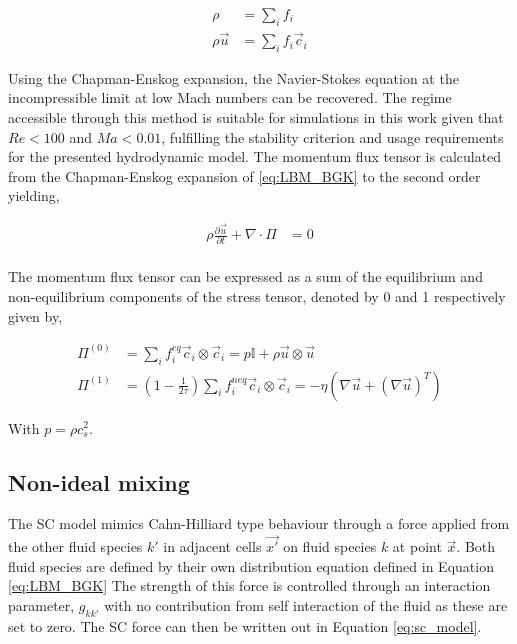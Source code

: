 \begin{equation}
    \begin{split}
        \rho &= \sum_i f_i \\
        \rho\vec{u} &= \sum_i f_i \vec{c}_i
    \end{split}
\end{equation}

Using the Chapman-Enskog expansion, the Navier-Stokes equation at the incompressible limit at low Mach
numbers can be recovered. \cite{qian_lattice_1992, he_lattice_1997} The regime accessible through this method is suitable 
for simulations in this work given that $Re < 100$ and $Ma < 0.01$, fulfilling the stability 
criterion and usage requirements for the presented hydrodynamic model.
The momentum flux tensor is calculated from the Chapman-Enskog expansion of \ref{eq:LBM_BGK} to the second order yielding,

\begin{equation}
    \begin{split}
        \rho\frac{\partial \vec{u}}{\partial t} + \nabla \cdot \Pi &= 0 \\
    \end{split}
\end{equation}

The momentum flux tensor can be expressed as a sum of the equilibrium and non-equilibrium components of the stress tensor, denoted by 0 and 1 respectively given by,

\begin{equation}
    \begin{split}
        \Pi^{(0)} &= \sum_i f_i^{eq} \vec{c}_i \otimes \vec{c}_i = p\mathbb{I} + \rho \vec{u} \otimes \vec{u} \\
        \Pi^{(1)} &= (1 - \frac{1}{2 \tau})\sum_i f_i^{neq} \vec{c}_i \otimes \vec{c}_i = -\eta (\nabla \vec{u} + (\nabla \vec{u})^T)
    \end{split}
\end{equation}

With $p = \rho c_s^2$.

\subsection{Non-ideal mixing}
\label{section:lbm_non_ideal_mixing}

The SC model mimics Cahn-Hilliard type behaviour through a force applied from the other fluid species $k'$ in adjacent 
cells $\vec{x'}$ on fluid species $k$ at point $\vec{x}$. \cite{shan_lattice_1993, shan_simulation_1994, 
shan_multicomponent_1995, he_discrete_1998, jansen_bijels_2011, chin_lattice_2002} Both fluid species are defined
by their own distribution equation defined in Equation \ref{eq:LBM_BGK} The strength of this force is controlled 
through an interaction parameter, $g_{kk'}$ with no contribution from self interaction of the fluid as these are 
set to zero. The SC force can then be written out in Equation \ref{eq:sc_model}.

